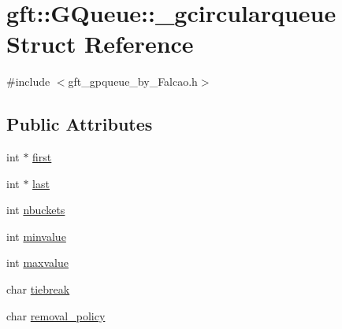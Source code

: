 \hypertarget{structgft_1_1GQueue_1_1__gcircularqueue}{\section{gft\-:\-:G\-Queue\-:\-:\-\_\-gcircularqueue Struct Reference}
\label{structgft_1_1GQueue_1_1__gcircularqueue}
}


{\ttfamily \#include $<$gft\-\_\-gpqueue\-\_\-by\-\_\-\-Falcao.\-h$>$}

\subsection*{Public Attributes}
\begin{DoxyCompactItemize}
\item 
int $\ast$ \hyperlink{structgft_1_1GQueue_1_1__gcircularqueue_aabbe2dc3b5fb0aed62aa952b72dda244}{first}
\item 
int $\ast$ \hyperlink{structgft_1_1GQueue_1_1__gcircularqueue_af6757641a12f8941ae6647dc25459bd9}{last}
\item 
int \hyperlink{structgft_1_1GQueue_1_1__gcircularqueue_a16e352842988e1d437bddb69636d2a31}{nbuckets}
\item 
int \hyperlink{structgft_1_1GQueue_1_1__gcircularqueue_a60003a1b76dc5941cddb111e03a3a0dd}{minvalue}
\item 
int \hyperlink{structgft_1_1GQueue_1_1__gcircularqueue_a0c7ec2c2f5a55366dd2ba1340338b192}{maxvalue}
\item 
char \hyperlink{structgft_1_1GQueue_1_1__gcircularqueue_a8c5f0458ca42a97a85f67e26d29ce844}{tiebreak}
\item 
char \hyperlink{structgft_1_1GQueue_1_1__gcircularqueue_a345e7c12de26b812fbbd88694eb777f6}{removal\-\_\-policy}
\end{DoxyCompactItemize}


